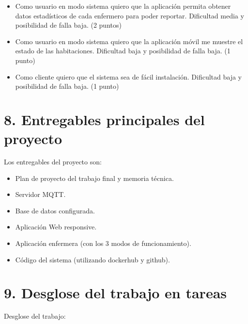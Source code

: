 \documentclass[
11pt, %
]{charter}
\begin{document}
\begin{itemize}
\item Como usuario en modo sistema quiero que la aplicación permita obtener datos estadísticos de cada enfermero para poder reportar. Dificultad media y posibilidad de falla baja. (2 puntos)

\item Como usuario en modo sistema quiero que la aplicación móvil me muestre el estado de las habitaciones. Dificultad baja y posibilidad de falla baja. (1 punto)

\item Como cliente quiero que el sistema sea de fácil instalación. Dificultad baja y posibilidad de falla baja. (1 punto)

\end{itemize}

\section{8. Entregables principales del proyecto}
\label{sec:entregables}



Los entregables del proyecto son:

\begin{itemize}
	\item Plan de proyecto del trabajo final y memoria técnica.
	\item Servidor MQTT.
	\item Base de datos configurada.
	\item Aplicación Web responsive.
	\item Aplicación enfermera (con los 3 modos de funcionamiento).
	\item Código del sistema (utilizando dockerhub y github).
\end{itemize}

\section{9. Desglose del trabajo en tareas}
\label{sec:wbs}

Desglose del trabajo:
\end{document}
